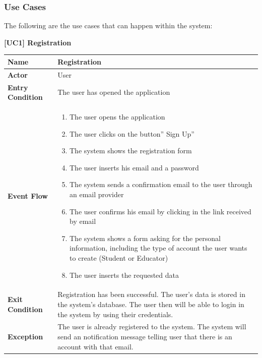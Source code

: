 \documentclass{article}
\begin{document}
\subsubsection{Use Cases}
The following are the use cases that can happen within the system:
\begin{table}
 \renewcommand{\arraystretch}{1.5}
    \centering
    \raggedright\textbf{[UC1] Registration }
    \begin{tabular}{|l|p{10cm}|}
        \hline
        \textbf{Name} & Registration \\
        \hline
        \textbf{Actor} & User \\
        \hline
        \textbf{Entry Condition} & 
        The user has opened the application \\
        \hline
        \textbf{Event Flow} & 
        \begin{enumerate}[align=left, topsep=0pt, partopsep=0pt]
            \item The user opens the application 
            \item The user clicks on the button” Sign Up” 
            \item The system shows the registration form 
            \item The user inserts his email and a password 
            \item The system sends a confirmation email to the user through an email provider 
            \item The user confirms his email by clicking in the link received by email 
            \item The system shows a form asking for the personal information, including the type of account the user wants to create (Student or Educator)
            \item The user inserts the requested data 
        \end{enumerate} \\
        \hline
        \textbf{Exit Condition} & Registration has been successful. The user’s data is stored in the system’s database. The user then will be able to login in the system by using their credentials.  \\
        \hline
        \textbf{Exception} & The user is already registered to the system. The system will send an notification message telling user that there is an account with that email. \\
        \hline
    \end{tabular}
\end{table}
\end{document}
